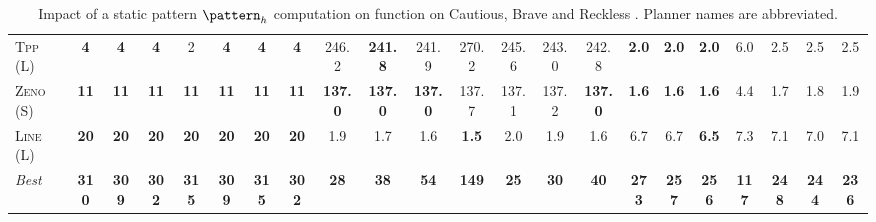\begin{table}[tb]
{\begin{tabular}{|l||ccccccc||ccccccc||ccccccc||}
\textsc{Tpp} (L)&\textbf{4}&\textbf{4}&\textbf{4}&2&\textbf{4}&\textbf{4}&\textbf{4}&246.2&\textbf{241.8}&241.9&270.2&245.6&243.0&242.8&\textbf{2.0}&\textbf{2.0}&\textbf{2.0}&6.0&2.5&2.5&2.5\\
\textsc{Zeno} (S)&\textbf{11}&\textbf{11}&\textbf{11}&\textbf{11}&\textbf{11}&\textbf{11}&\textbf{11}&\textbf{137.0}&\textbf{137.0}&\textbf{137.0}&137.7&137.1&137.2&\textbf{137.0}&\textbf{1.6}&\textbf{1.6}&\textbf{1.6}&4.4&1.7&1.8&1.9\\
\textsc{Line} (L)&\textbf{20}&\textbf{20}&\textbf{20}&\textbf{20}&\textbf{20}&\textbf{20}&\textbf{20}&1.9&1.7&1.6&\textbf{1.5}&2.0&1.9&1.6&6.7&6.7&\textbf{6.5}&7.3&7.1&7.0&7.1
\\\hline
\textit{Best}&\textbf{310}&\textbf{309}&\textbf{302}&\textbf{315}&\textbf{309}&\textbf{315}&\textbf{302}&\textbf{28}&\textbf{38}&\textbf{54}&\textbf{149}&\textbf{25}&\textbf{30}&\textbf{40}&\textbf{273}&\textbf{257}&\textbf{256}&\textbf{117}&\textbf{248}&\textbf{244}&\textbf{236}\\\hline

        \end{tabular}}
        \caption{Impact of a static pattern $\pattern_h$ computation on function on Cautious, Brave and Reckless \pattyd. Planner names are abbreviated.}
        \label{tab:abl-patternh-static}
        \end{table}
        